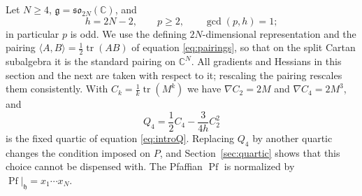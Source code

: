 \documentclass[10pt,reqno]{amsart}
\numberwithin{equation}{section}
\theoremstyle{plain}
\theoremstyle{definition}
\DeclareMathOperator{\tr}{tr}
\DeclareMathOperator{\Pf}{Pf}
\newcommand{\ip}[2]{\langle #1, #2\rangle}
\begin{document}
Let $N\ge4$, $\mathfrak{g}=\mathfrak{so}_{2N}(\mathbb{C})$, and
\begin{equation}\label{eq:Dhyp}
h=2N-2,\qquad p\ge2,\qquad \gcd(p,h)=1 ;
\end{equation}
in particular $p$ is odd. We use the defining $2N$-dimensional representation and the pairing $\ip AB=\tfrac12\tr(AB)$ of equation \eqref{eq:pairings}, so that on the split Cartan subalgebra it is the standard pairing on $\mathbb{C}^N$. All gradients and Hessians in this section and the next are taken with respect to it; rescaling the pairing rescales them consistently. With $C_k=\tfrac1k\tr(M^k)$ we have $\nabla C_2=2M$ and $\nabla C_4=2M^3$, and 
\begin{equation*}
    Q_4=\frac12C_4-\frac3{4h}C_2^2
\end{equation*}
is the fixed quartic of equation \eqref{eq:introQ}. Replacing $Q_4$ by another quartic changes the condition imposed on $P$, and Section~\ref{sec:quartic} shows that this choice cannot be dispensed with. The Pfaffian $\Pf$ is normalized by $\Pf|_\mathfrak{h}=x_1\cdots x_N$.
\end{document}
